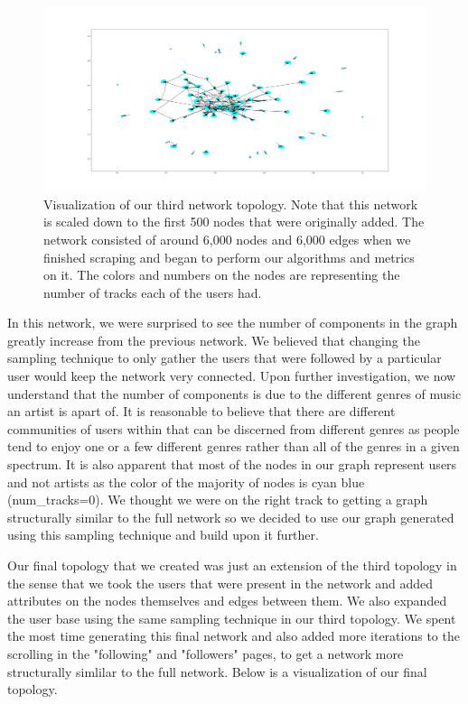\documentclass{article}
\begin{document}
\begin{figure}[h]
	\centering
	\includegraphics[scale=0.43]{take_3_visualization}
	\caption{Visualization of our third network topology.  Note that this network is scaled down to the first 500 nodes that were originally added.  The network consisted of around 6,000 nodes and 6,000 edges when we finished scraping and began to perform our algorithms and metrics on it.  The colors and numbers on the nodes are representing the number of tracks each of the users had.}
\end{figure}

In this network, we were surprised to see the number of components in the graph greatly increase from the previous network.  We believed that changing the sampling technique to only gather the users that were followed by a particular user would keep the network very connected.  Upon further investigation, we now understand that the number of components is due to the different genres of music an artist is apart of.  It is reasonable to believe that there are different communities of users within that can be discerned from different genres as people tend to enjoy one or a few different genres rather than all of the genres in a given spectrum.  It is also apparent that most of the nodes in our graph represent users and not artists as the color of the majority of nodes is cyan blue (num\_tracks=0).  We thought we were on the right track to getting a graph structurally similar to the full network so we decided to use our graph generated using this sampling technique and build upon it further.

Our final topology that we created was just an extension of the third topology in the sense that we took the users that were present in the network and added attributes on the nodes themselves and edges between them.  We also expanded the user base using the same sampling technique in our third topology.  We spent the most time generating this final network and also added more iterations to the scrolling in the "following" and "followers" pages, to get a network more structurally simlilar to the full network.  Below is a visualization of our final topology.
\end{document}
